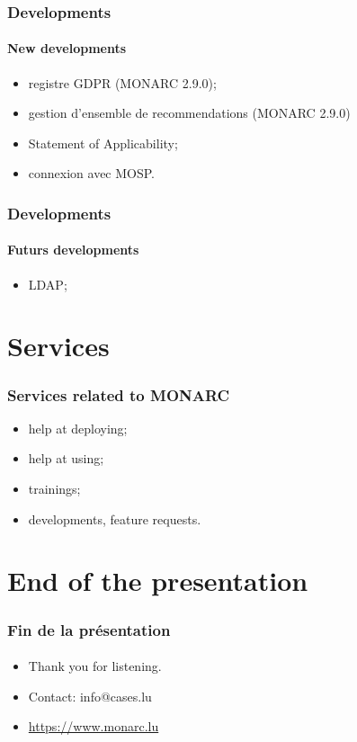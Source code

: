 \documentclass[]{beamer}
\begin{document}
\begin{frame}
    \frametitle{Developments}
    \framesubtitle{New developments}
    \begin{itemize}
        \item registre GDPR (MONARC 2.9.0);
        \item gestion d'ensemble de recommendations (MONARC 2.9.0)
        \item Statement of Applicability;
        \item connexion avec MOSP.
    \end{itemize}
\end{frame}

\begin{frame}
    \frametitle{Developments}
    \framesubtitle{Futurs developments}
    \begin{itemize}
        \item LDAP;
        
    \end{itemize}
\end{frame}




%
%
\section*{Services}
\begin{frame}
    \frametitle{Services related to MONARC}
    \begin{center}
        \begin{itemize}
            \item help at deploying;
            \item help at using;
            \item trainings;
            \item developments, feature requests.
        \end{itemize}
    \end{center}
\end{frame}




%
%
\section*{End of the presentation}
\begin{frame}
    \frametitle{Fin de la présentation}
    \framesubtitle{}
    \begin{center}
        \begin{itemize}
            \item Thank you for listening.
            \item Contact: info@cases.lu
            \item \url{https://www.monarc.lu}
        \end{itemize}
    \end{center}
\end{frame}
\end{document}
